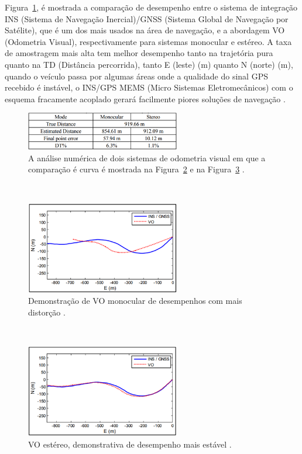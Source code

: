 Figura~\ref{fig:Figures/AnaliseOdometria}, é mostrada a comparação de desempenho entre o sistema de integração INS (Sistema de Navegação Inercial)/GNSS (Sistema Global de Navegação por Satélite), que é um dos mais usados na área de navegação, e a abordagem VO (Odometria Visual), respectivamente para sistemas monocular e estéreo. A taxa de amostragem mais alta tem melhor desempenho tanto na trajetória pura quanto na TD (Distância percorrida), tanto E (leste) (m) quanto N (norte) (m), quando o veículo passa por algumas áreas onde a qualidade do sinal GPS recebido é instável, o INS/GPS MEMS (Micro Sistemas Eletromecânicos) com o esquema fracamente acoplado gerará facilmente piores soluções de navegação \cite{chen2015performance}.
\ \\
\begin{figure}[!htb]
	\centering	
	\includegraphics[width=0.6\textwidth]{Figures/AnaliseOdometria.png}
	\caption{A análise numérica de dois sistemas de odometria visual em que a comparação é curva é mostrada na Figura~\ref{fig:Figures/DemoPerMonocular} e na Figura~\ref{fig:Figures/DemoPerEstereo}
	\cite{chen2015performance}.}
	\label{fig:Figures/AnaliseOdometria}
\end{figure}
\ \\
\begin{figure}[!htb]
	\centering	
	\includegraphics[width=0.6\textwidth]{Figures/DemoPerMonocular.png}
	\caption{Demonstração de VO monocular de desempenhos com mais distorção
	\cite{chen2015performance}.}
	\label{fig:Figures/DemoPerMonocular}
\end{figure}
\ \\
\begin{figure}[!htb]
	\centering	
	\includegraphics[width=0.6\textwidth]{Figures/DemoPerEstereo.png}
	\caption{VO estéreo, demonstrativa de desempenho mais estável \cite{chen2015performance}.}
	\label{fig:Figures/DemoPerEstereo}
\end{figure}
\ \\

